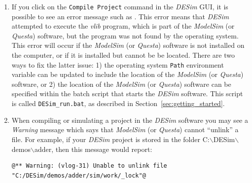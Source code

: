 {\begin{enumerate}
\item If you click on the \texttt{Compile Project} command in the {\it DESim} GUI, it is
possible to see an error message such as 
. This error means that
{\it DESim} attempted to execute the {\it vlib} program, which is part of the 
{\it ModelSim} (or {\it Questa}) software, but the program was not found by the
operating system. This error will occur if the {\it ModelSim} (or {\it Questa}) software 
is not installed on the computer, or if it is installed but cannot be be located. There are 
two ways to fix the latter issue: 1) the operating system \texttt{Path} environment variable 
can be updated to include the location of the {\it ModelSim} (or {\it Questa}) software, 
or 2) the location of the {\it ModelSim} (or {\it Questa}) software can be specified within 
the batch script that starts the {\it DESim} software. This script is called 
\texttt{DESim\_run.bat}, as described in Section~\ref{sec:getting_started}.

\item When compiling or simulating a project in the {\it DESim} software you may
see a {\it Warning} message which says that {\it ModelSim} (or {\it Questa}) cannot 
``unlink'' a file.  For example, if your {\it DESim} project is stored in the folder
C:$\backslash$DESim$\backslash$demos$\backslash$adder, then this message would report: 

\noindent
\begin{minipage}[h]{18 cm}
\begin{lstlisting}[]
@** Warning: (vlog-31) Unable to unlink file "C:/DESim/demos/adder/sim/work/_lock"@
\end{lstlisting}
\end{minipage}


\end{enumerate}}
